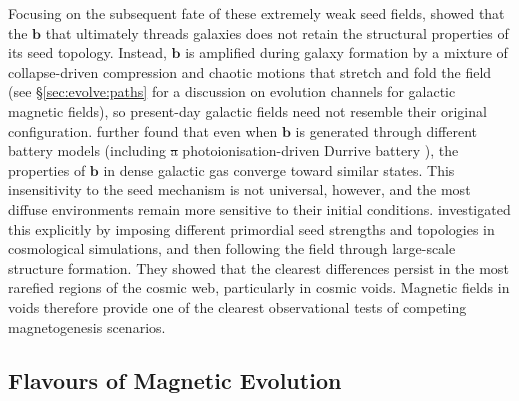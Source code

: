 \documentclass[12pt,twoside]{extreport}
\makeatletter
\newcommand{\mVector}[1]{\bm{#1}} %
\providecommand{\DIFaddtex}[1]{{\protect\color{DIFgreen}\uwave{#1}}} %
\providecommand{\DIFdeltex}[1]{{\protect\color{DIFpurple}\sout{#1}}} %
\providecommand{\DIFaddbegin}{} %
\providecommand{\DIFaddend}{} %
\providecommand{\DIFdelbegin}{} %
\providecommand{\DIFdelend}{} %
\providecommand{\DIFadd}[1]{\texorpdfstring{\DIFaddtex{#1}}{#1}} %
\providecommand{\DIFdel}[1]{\texorpdfstring{\DIFdeltex{#1}}{}} %
\providecommand{\DIFscaledelfig}{0.5}
\newlength{\DIFdelgraphicswidth} %
\newlength{\DIFdelgraphicsheight} %
\providecommand{\DIFaddincludegraphics}[2][]{{\color{DIFgreen}\fbox{\DIFOincludegraphics[#1]{#2}}}} %
\providecommand{\DIFdelincludegraphics}[2][]{%
\sbox{\DIFdelgraphicsbox}{\DIFOincludegraphics[#1]{#2}}%
\settoboxwidth{\DIFdelgraphicswidth}{\DIFdelgraphicsbox} %
\settoboxtotalheight{\DIFdelgraphicsheight}{\DIFdelgraphicsbox} %
\scalebox{\DIFscaledelfig}{%
\parbox[b]{\DIFdelgraphicswidth}{\usebox{\DIFdelgraphicsbox}\\[-\baselineskip] \rule{\DIFdelgraphicswidth}{0em}}\llap{\resizebox{\DIFdelgraphicswidth}{\DIFdelgraphicsheight}{%
\setlength{\unitlength}{\DIFdelgraphicswidth}%
\begin{picture}(1,1)%
\thicklines\linethickness{2pt} %
{\color{DIFpurple}\put(0,0){\framebox(1,1){}}}%
{\color{DIFpurple}\put(0,0){\line( 1,1){1}}}%
{\color{DIFpurple}\put(0,1){\line(1,-1){1}}}%
\end{picture}%
}\hspace*{3pt}}} %
} %
\DeclareRobustCommand{\DIFaddbegin}{\DIFOaddbegin \let\includegraphics\DIFaddincludegraphics} %
\DeclareRobustCommand{\DIFaddend}{\DIFOaddend \let\includegraphics\DIFOincludegraphics} %
\DeclareRobustCommand{\DIFdelbegin}{\DIFOdelbegin \let\includegraphics\DIFdelincludegraphics} %
\DeclareRobustCommand{\DIFdelend}{\DIFOaddend \let\includegraphics\DIFOincludegraphics} %
\let\sout@orig\sout %
\renewcommand{\sout}[1]{\ifmmode\text{\sout@orig{\ensuremath{#1}}}\else\sout@orig{#1}\fi} %
\makeatother
\begin{document}
Focusing on the subsequent fate of these extremely weak seed fields, \citet{garaldi2021magnetogenesis} showed that the $\mVector{b}$ that ultimately threads galaxies does not retain the structural properties of its seed topology. Instead, $\mVector{b}$ is amplified during galaxy formation by a mixture of collapse-driven compression and chaotic motions that stretch and fold the field (see \S\ref{sec:evolve:paths} for a discussion on evolution channels for galactic magnetic fields), so present-day galactic fields need not resemble their original configuration. \citet{garaldi2021magnetogenesis} further found that even when $\mVector{b}$ is generated through different battery models (including \DIFdelbegin \DIFdel{a }\DIFdelend \DIFaddbegin \DIFadd{the }\DIFaddend photoionisation-driven Durrive battery \DIFaddbegin \DIFadd{\mbox{%
\citep{durrive2015intergalactic}}\hskip0pt%
}\DIFaddend ), the properties of $\mVector{b}$ in dense galactic gas converge toward similar states. This insensitivity to the seed mechanism is not universal, however, and the most diffuse environments remain more sensitive to their initial conditions. \citet{mtchedlidze2022evolution} investigated this explicitly by imposing different primordial seed strengths and topologies in cosmological simulations, and then following the field through large-scale structure formation. They showed that the clearest differences persist in the most rarefied regions of the cosmic web, particularly in cosmic voids. Magnetic fields in voids therefore provide one of the clearest observational tests of competing magnetogenesis scenarios.

\subsection{Flavours of Magnetic Evolution}
\label{sec:evolve}
\end{document}
